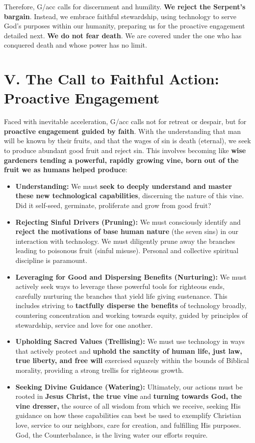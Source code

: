 \documentclass[11pt]{article}
\begin{document}
Therefore, G/acc calls for discernment and humility. \textbf{We reject the Serpent's bargain}. Instead, we embrace faithful stewardship, using technology to serve God's purposes within our humanity, preparing us for the proactive engagement detailed next. \textbf{We do not fear death}. We are covered under the one who has conquered death and whose power has no limit. 



\section*{V. The Call to Faithful Action: Proactive Engagement}

Faced with inevitable acceleration, G/acc calls not for retreat or despair, but for\textbf{ proactive engagement guided by faith}. With the understanding that man will be known by their fruits, and that the wages of sin is death (eternal), we seek to produce abundant good fruit and reject sin. This involves becoming like \textbf{wise gardeners tending a powerful, rapidly growing vine, born out of the fruit we as humans helped produce}:

\begin{itemize}
    \item \textbf{Understanding:} We must \textbf{seek to deeply understand and master these new technological capabilities}, discerning the nature of this vine. Did it self-seed, germinate, proliferate and grow from good fruit?
    \item \textbf{Rejecting Sinful Drivers (Pruning):} We must consciously identify and \textbf{reject the motivations of base human nature} (the seven sins) in our interaction with technology. We must diligently prune away the branches leading to poisonous fruit (sinful misuse). Personal and collective spiritual discipline is paramount.
    \item \textbf{Leveraging for Good and Dispersing Benefits (Nurturing):} We must actively seek ways to leverage these powerful tools for righteous ends, carefully nurturing the branches that yield life giving sustenance. This includes striving to \textbf{tactfully disperse the benefits} of technology broadly, countering concentration and working towards equity, guided by principles of stewardship, service and love for one another.
    \item \textbf{Upholding Sacred Values (Trellising):} We must use technology in ways that actively protect and \textbf{uphold the sanctity of human life, just law, true liberty, and free will} exercised squarely within the bounds of Biblical morality, providing a strong trellis for righteous growth.
    \item \textbf{Seeking Divine Guidance (Watering):} Ultimately, our actions must be rooted in \textbf{Jesus Christ, the true vine} and \textbf{turning towards God, the vine dresser,} the source of all wisdom from which we receive, seeking His guidance on how these capabilities can best be used to exemplify Christian love, service to our neighbors, care for creation, and fulfilling His purposes. God, the Counterbalance, is the living water our efforts require.
\end{itemize}
\end{document}
